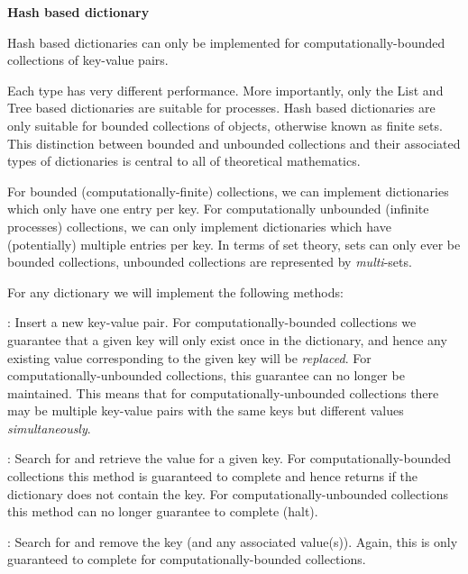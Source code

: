 \item {\bf Hash based dictionary}

Hash based dictionaries can only be implemented for computationally-bounded 
collections of key-value pairs. 

\stopitemize

Each type has very different performance. More importantly, only the List 
and Tree based dictionaries are suitable for processes. Hash based 
dictionaries are only suitable for bounded collections of objects, 
otherwise known as finite sets. This distinction between bounded and 
unbounded collections and their associated types of dictionaries is 
central to all of theoretical mathematics. 

For bounded (computationally-finite) collections, we can implement 
dictionaries which only have one entry per key. For computationally 
unbounded (infinite processes) collections, we can only implement 
dictionaries which have (potentially) multiple entries per key. In terms 
of set theory, sets can only ever be bounded collections, unbounded 
collections are represented by \emph{multi}-sets. 

For any dictionary we will implement the following methods:

\startitemize

\item {}: Insert a new key-value pair. For 
computationally-bounded collections we guarantee that a given key will 
only exist once in the dictionary, and hence any existing value 
corresponding to the given key will be \emph{replaced}. For 
computationally-unbounded collections, this guarantee can no longer be 
maintained. This means that for computationally-unbounded collections 
there may be multiple key-value pairs with the same keys but different 
values \emph{simultaneously}. 

\item {}: Search for and retrieve the value for a given 
key. For computationally-bounded collections this method is guaranteed to 
complete and hence returns  if the dictionary does not contain 
the key. For computationally-unbounded collections this method can no 
longer guarantee to complete (halt). 

\item {}: Search for and remove the key (and any associated 
value(s)). Again, this is only guaranteed to complete for 
computationally-bounded collections.

\stopitemize

